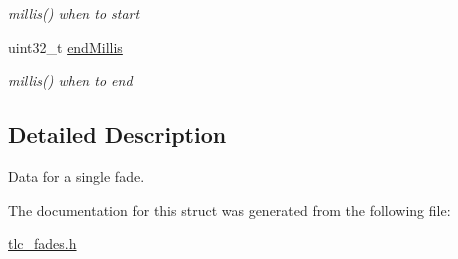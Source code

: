\begin{DoxyCompactItemize}
\begin{DoxyCompactList}\small\item\em millis() when to start \end{DoxyCompactList}\item 
uint32\+\_\+t \hyperlink{structTlc__Fade_a0b2cfd1cc3a45e0886a9cdc72322b13f}{end\+Millis}\hypertarget{structTlc__Fade_a0b2cfd1cc3a45e0886a9cdc72322b13f}{}\label{structTlc__Fade_a0b2cfd1cc3a45e0886a9cdc72322b13f}

\begin{DoxyCompactList}\small\item\em millis() when to end \end{DoxyCompactList}\end{DoxyCompactItemize}


\subsection{Detailed Description}
Data for a single fade. 

The documentation for this struct was generated from the following file\+:\begin{DoxyCompactItemize}
\item 
\hyperlink{tlc__fades_8h}{tlc\+\_\+fades.\+h}\end{DoxyCompactItemize}
